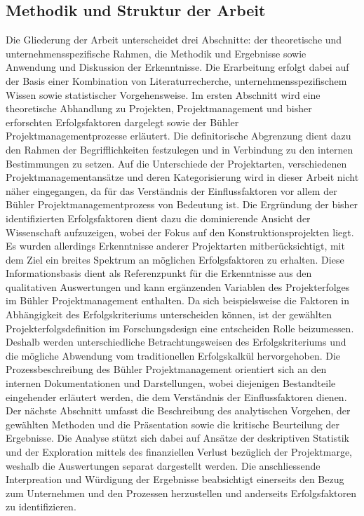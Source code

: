 \subsection{Methodik und Struktur der Arbeit}
Die Gliederung der Arbeit unterscheidet drei Abschnitte: der theoretische und unternehmensspezifische Rahmen, die Methodik und Ergebnisse sowie Anwendung und Diskussion der Erkenntnisse. Die Erarbeitung erfolgt dabei auf der Basis einer Kombination von Literaturrecherche, unternehmensspezifischem Wissen sowie statistischer Vorgehensweise.
\newline\newline
Im ersten Abschnitt wird eine theoretische Abhandlung zu Projekten, Projektmanagement und bisher erforschten Erfolgsfaktoren dargelegt sowie der Bühler Projektmanagementprozesse erläutert. Die definitorische Abgrenzung dient dazu den Rahmen der Begrifflichkeiten festzulegen und in Verbindung zu den internen Bestimmungen zu setzen. Auf die Unterschiede der Projektarten, verschiedenen Projektmanagementansätze und deren Kategorisierung wird in dieser Arbeit nicht näher eingegangen, da für das Verständnis der Einflussfaktoren vor allem der Bühler Projektmanagementprozess von Bedeutung ist. Die Ergründung der bisher identifizierten Erfolgsfaktoren dient dazu die dominierende Ansicht der Wissenschaft aufzuzeigen, wobei der Fokus auf den Konstruktionsprojekten liegt. Es wurden allerdings Erkenntnisse anderer Projektarten mitberücksichtigt, mit dem Ziel ein breites Spektrum an möglichen Erfolgsfaktoren zu erhalten. Diese Informationsbasis dient als Referenzpunkt für die Erkenntnisse aus den qualitativen Auswertungen und kann ergänzenden Variablen des Projekterfolges im Bühler Projektmanagement enthalten. Da sich beispielsweise die Faktoren in Abhängigkeit des Erfolgskriteriums unterscheiden können, ist der gewählten Projekterfolgsdefinition im Forschungsdesign eine entscheiden Rolle beizumessen. Deshalb werden unterschiedliche Betrachtungsweisen des Erfolgskriteriums und die mögliche Abwendung vom traditionellen Erfolgskalkül hervorgehoben. Die Prozessbeschreibung des Bühler Projektmanagement orientiert sich an den internen Dokumentationen und Darstellungen, wobei diejenigen Bestandteile eingehender erläutert werden, die dem Verständnis der Einflussfaktoren dienen.
\newline\newline
Der nächste Abschnitt umfasst die Beschreibung des analytischen Vorgehen, der gewählten Methoden und die Präsentation sowie die kritische Beurteilung der Ergebnisse. Die Analyse stützt sich dabei auf Ansätze der deskriptiven Statistik und der Exploration mittels des finanziellen Verlust bezüglich der Projektmarge, weshalb  die Auswertungen separat dargestellt werden. Die anschliessende Interpreation und Würdigung der Ergebnisse beabsichtigt einerseits den Bezug zum Unternehmen und den Prozessen herzustellen und anderseits Erfolgsfaktoren zu identifizieren. 
